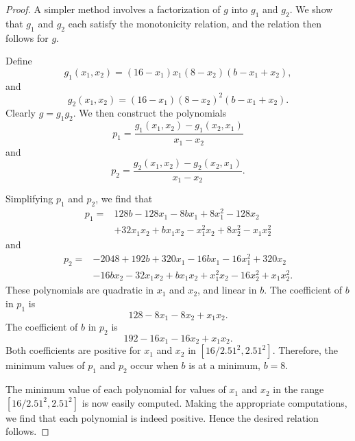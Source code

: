 \begin{proof}
A simpler method involves a factorization of $g$ into
$g_1$ and $g_2$.  We show that $g_1$ and $g_2$ each
satisfy the monotonicity relation, and the relation then follows for $g$.

Define
\[
g_1(x_1,x_2) = (16-x_1) x_1 (8-x_2) (b-x_1+x_2),
\]
and
\[
g_2(x_1,x_2) = (16-x_1)(8-x_2)^2(b-x_1+x_2).
\]
Clearly
$g = g_1 g_2$.  We then construct the polynomials
\[
p_1 = \frac{g_1(x_1,x_2) - g_1(x_2,x_1)}{x_1-x_2}
\]
and
\[
p_2 = \frac{g_2(x_1,x_2) - g_2(x_2,x_1)}{x_1-x_2}.
\]

Simplifying $p_1$ and $p_2$, we find that
\begin{align*}
p_1 = & 128b - 128x_1 -8b x_1 + 8 x_1^2 - 128 x_2 \\
    & + 32 x_1 x_2 + b x_1 x_2 -x_1^2 x_2 + 8 x_2^2 - x_1 x_2^2
\end{align*}
and
\begin{align*}
p_2 = & -2048 + 192b + 320x_1 -16b x_1 -16x_1^2 +
    320x_2 \\ & - 16b x_2 -32 x_1 x_2 +b x_1 x_2 +
    x_1^2 x_2 - 16x_2^2 + x_1 x_2^2.
\end{align*}
These polynomials are quadratic in $x_1$ and $x_2$,
and linear in $b$.  The coefficient of $b$ in $p_1$
is
\[
128 -8x_1 -8x_2 + x_1 x_2.
\]
The coefficient of $b$ in $p_2$ is
\[
192 - 16x_1 -16x_2 + x_1 x_2.
\]
Both coefficients are positive for
$x_1$ and $x_2$ in $[16/2.51^2,2.51^2]$.  Therefore, the
minimum values of $p_1$ and $p_2$ occur
when $b$ is at a minimum, $b=8$.

The minimum value of each polynomial
for values of $x_1$ and $x_2$ in the range $[16/2.51^2,2.51^2]$
is now easily computed.
Making the appropriate computations, we find that each polynomial
is indeed positive.  Hence the desired relation follows.
\end{proof}

